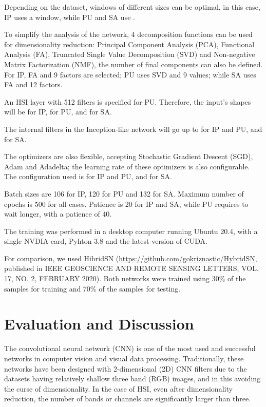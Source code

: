 \documentclass[lettersize, journal]{IEEEtran}
\begin{document}
Depending on the dataset, windows of different sizes can be optimal, in this case, IP uses a  window, while PU and SA use .  

To simplify the analysis of the network, 4 decomposition functions can be used for dimensionality reduction: Principal Component Analysis (PCA), Functional Analysis (FA), Truncated Single Value Decomposition (SVD) and Non-negative Matrix Factorization (NMF), the number of final components can also be defined. For IP, FA and 9 factors are selected; PU uses SVD and 9 values; while SA uses FA and 12 factors.

An HSI layer with 512 filters is specified for PU. Therefore, the input's shapes will be  for IP,  for PU, and  for SA. 

The internal filters in the Inception-like network will go up to  for IP and PU, and  for SA. 

The optimizers are also flexible, accepting Stochastic Gradient Descent (SGD), Adam and Adadelta; the learning rate of these optimizers is also configurable. The configuration used is  for IP and PU, and  for SA.

Batch sizes are 106 for IP, 120 for PU and 132 for SA. Maximum number of epochs is 500  for all cases. Patience is 20 for IP and SA, while PU requires to wait longer, with a patience of 40.

The training was performed in a desktop computer running Ubuntu 20.4, with a single NVDIA card, Pyhton 3.8 and the latest version of CUDA.

For comparison, we used HibridSN (\url{https://github.com/gokriznastic/HybridSN}, published in IEEE GEOSCIENCE AND REMOTE SENSING LETTERS, VOL. 17, NO. 2, FEBRUARY 2020). Both networks were trained using 30\% of the samples for training and 70\% of the samples for testing. 

\section{Evaluation and Discussion}

The convolutional neural network (CNN) is one of the most used and successful networks in computer vision and visual data processing. Traditionally, these networks have been designed with 2-dimensional (2D) CNN filters due to the datasets having relatively shallow three band (RGB) images, and in this avoiding the curse of dimensionality. In the case of HSI, even after dimensionality reduction, the number of bands or channels are significantly larger than three. 
\end{document}
